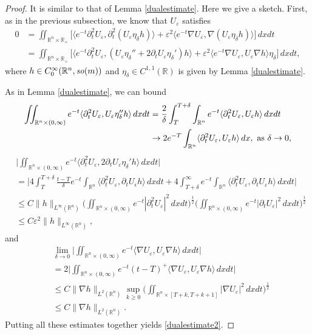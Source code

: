 \documentclass[12pt,twoside,reqno]{amsart}
\theoremstyle{definition}              %
\theoremstyle{remark}                  %
\newcommand{\R}{\mathbb{R}}                 %
\newcommand{\eps}{\varepsilon}
\renewcommand{\1}{\mathbbm{1}}                                      %
\numberwithin{equation}{section}
\numberwithin{definition}{section}
\numberwithin{theorem}{section}
\numberwithin{remark}{section}
\begin{document}
\begin{proof} It is similar to that of Lemma \ref{dualestimate}. Here we give a sketch. First, as in the previous subsection, we know that $U_\eps$ satisfies
\begin{align*}
0&=\iint_{\mathbb{R}^n\times\R_+}
\Big[\langle e^{-t}\partial_t^2U_\eps, \partial_t^2(U_\eps \eta_\delta h)\rangle +\eps^2 \langle e^{-t}\nabla U_\eps,  \nabla(U_\eps\eta_\delta h)\rangle \Big]\,dxdt\\
&=\iint_{\mathbb{R}^n\times\R_+}
\Big[\langle e^{-t}\partial_t^2U_\eps, (U_\eps \eta_\delta''+2\partial_tU_\eps\eta_\delta')h\rangle +
\eps^2 \langle e^{-t}\nabla U_\eps, U_\eps \nabla h\rangle \eta_\delta\Big]\,dxdt,
\end{align*}
where $h\in C_0^\infty(\R^n, {\it so}(m))$ and $\eta_\delta\in C^{1,1}(\R)$ is given by Lemma \ref{dualestimate}.

As in Lemma \ref{dualestimate}, we can bound
\begin{align*}
\iint_{\R^n\times (0,\infty)}
e^{-t}\langle \partial_t^2 U_\eps, U_\eps \eta_\delta''h\rangle\,dxdt
&=\frac{2}{\delta}\int_{T}^{T+\delta}\int_{\R^n} 
e^{-t}\langle \partial_t^2 U_\eps, U_\eps h\rangle \,dxdt\\
&\rightarrow  2e^{-T}
\int_{\R^n} \langle\partial_t^2 U_\eps, U_\eps h\rangle\,dx, \  {\rm{as}}\ \delta\to 0,
\end{align*}
\begin{align*}
&\Big|\iint_{\R^n\times (0,\infty)}
e^{-t}\langle \partial_t^2 U_\eps, 2\partial_t U_\eps \eta_\delta'h\rangle\,dxdt\Big|\\
&=\Big|4\int_T^{T+\delta} \frac{t-T}{\delta}e^{-t}\int_{\R^n}
\langle\partial_t^2 U_\eps, \partial_t U_\epsilon h\rangle\,dxdt
+4\int_{T+\delta}^{\infty}e^{-t}\int_{\R^n}\langle\partial_t^2 U_\eps, \partial_t U_\eps h\rangle \,dxdt\Big|\\
&\le C\big\|h\big\|_{L^\infty(\R^n)}
\Big(\iint_{\R^n\times (0,\infty)} e^{-t}|\partial_t^2 U_\eps|^2\,dxdt\Big)^\frac12
\Big(\iint_{\R^n\times (0,\infty)} e^{-t}|\partial_t U_\eps|^2\,dxdt\Big)^\frac12\\
&\le C\eps^2 \big\|h\big\|_{L^\infty(\R^n)},
\end{align*}
and
\begin{align*}
&\lim_{\delta\to 0}
\Big|\iint_{\R^n\times (0,\infty)} e^{-t}\langle\nabla U_\eps, U_\eps\nabla h\rangle\,dxdt\Big|\\
&=2\Big|\iint_{\R^n\times (0,\infty)}e^{-t}(t-T)^+\langle\nabla U_\eps, U_\eps\nabla h\rangle\,dxdt\Big|\\
&\le C\big\|\nabla h\big\|_{L^2(\R^n)} \sup_{k\ge 0}
\Big(\iint_{\R^n\times [T+k, T+k+1]}|\nabla U_\eps|^2\,dxdt\Big)^\frac12\\
&\le C\big\|\nabla h\big\|_{L^2(\R^n)}.
\end{align*}
Putting all these estimates together yields \eqref{dualestimate2}.
\end{proof}
\end{document}
